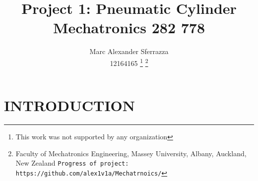 \documentclass[a4paper, 10pt]{article}
\title{\LARGE \bf Project 1: Pneumatic Cylinder\\Mechatronics  282 778}
\author{Marc Alexander Sferrazza \\ 12164165
\thanks{This work was not supported by any organization}
\thanks{Faculty of Mechatronics Engineering, Massey University, Albany, Auckland, New Zealand
        {\tt\small Progress of project: https://github.com/alex1v1a/Mechatrnoics/} } }
\begin{document}
\maketitle


\thispagestyle{empty}
\pagestyle{plain}



\begin{abstract}


\end{abstract}


\clearpage
\tableofcontents
\listoffigures
\thispagestyle{empty}
\clearpage


\setcounter{page}{1}

\section{INTRODUCTION}

%
%
%
\end{document}
